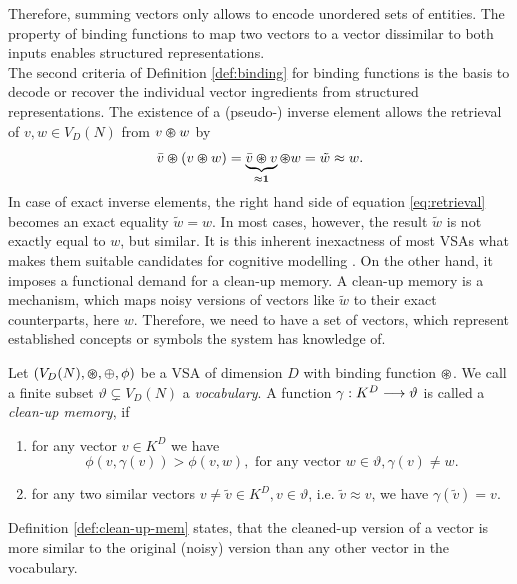 Therefore, summing vectors only allows to encode unordered sets of entities.
The property of binding functions to map two vectors to a vector dissimilar to both inputs enables structured representations.\\
The second criteria of Definition \ref{def:binding} for binding functions is the basis to decode or recover the individual vector ingredients from structured representations.
The existence of a (pseudo-) inverse element allows the retrieval of $v,w \in V_{D}(N)$ from $v \varoast w$ by
\begin{equation}
\label{eq:retrieval}
\bar{v} \varoast \left(v \varoast w\right) = \underbrace{\bar{v} \varoast v}_{\approx \mathbf{1}} \varoast w = \tilde{w} \approx w.
\end{equation}
In case of exact inverse elements, the right hand side of equation \ref{eq:retrieval} becomes an exact equality $\tilde{w}=w$.
In most cases, however, the result $\tilde{w}$ is not exactly equal to $w$, but similar.
It is this inherent inexactness of most \acp{VSA} what makes them suitable candidates for cognitive modelling \cite{Eliasmith2013}.
On the other hand, it imposes a functional demand for a clean-up memory.
A clean-up memory is a mechanism, which maps noisy versions of vectors like $\tilde{w}$ to their exact counterparts, here $w$.
Therefore, we need to have a set of vectors, which represent established concepts or symbols the system has knowledge of.

\begin{defn}
	\label{def:clean-up-mem}
	Let $(V_{D}(N), \varoast, \oplus, \phi)$ be a \acrfull{VSA} of dimension $D$ with binding function $\varoast$.
	We call a finite subset $\vartheta \subsetneq V_{D}(N)$ a \emph{vocabulary}.
	A function $\gamma: K^{D} \longrightarrow \vartheta$ is called a \emph{clean-up memory}, if
	\begin{enumerate}
		\item for any vector $v\in K^{D}$ we have
		\[
		\phi\left(v, \gamma(v)\right) > \phi\left(v, w\right), \textrm{ for any vector } w \in \vartheta, \gamma(v) \neq w.
		\]
		\item for any two similar vectors $ v \neq \tilde{v} \in K^{D}, v \in \vartheta$, i.e. $\tilde{v} \approx v$, we have $\gamma(\tilde{v})=v$.
	\end{enumerate}
\end{defn}
Definition \ref{def:clean-up-mem} states, that the cleaned-up version of a vector is more similar to the original (noisy) version than any other vector in the vocabulary.

